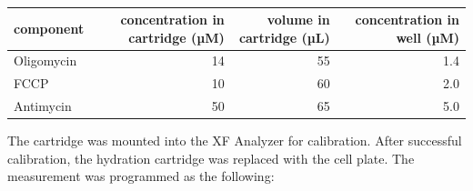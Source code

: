     \begin{table}[h]
    \capstart
    \centering
    \begin{minipage}{\captionwidth}
        \caption[toxins for seahorse]{}
        \label{tab:seahorse_toxins}
    \end{minipage}
    \begin{tabular}{|l|r|r|r|}
        \hline
        component  & concentration in cartridge (µM) & volume in cartridge (µL) & concentration in well (µM) \\ \hline
        Oligomycin & 14                             & 55                      & 1.4                        \\
        FCCP       & 10                             & 60                      & 2.0                        \\
        Antimycin  & 50                             & 65                      & 5.0                        \\ \hline
    \end{tabular}
    \end{table}

    The cartridge was mounted into the XF Analyzer for calibration. After successful calibration, the hydration cartridge was replaced with the cell plate. The measurement was programmed as the following:

